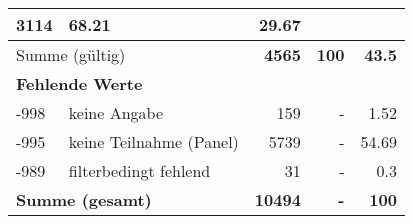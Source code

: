 \begin{longtable}{lXrrr}
       \num{3114} &
       \num[round-mode=places,round-precision=2]{68.21} &
         \num[round-mode=places,round-precision=2]{29.67} \\
     \midrule
     \multicolumn{2}{l}{Summe (gültig)} &
       \textbf{\num{4565}} &
     \textbf{\num{100}} &
       \textbf{\num[round-mode=places,round-precision=2]{43.5}} \\
     \multicolumn{5}{l}{\textbf{Fehlende Werte}}\\
       -998 &
       keine Angabe &
         \num{159} &
        - &
         \num[round-mode=places,round-precision=2]{1.52} \\
       -995 &
       keine Teilnahme (Panel) &
         \num{5739} &
        - &
         \num[round-mode=places,round-precision=2]{54.69} \\
       -989 &
       filterbedingt fehlend &
         \num{31} &
        - &
         \num[round-mode=places,round-precision=2]{0.3} \\
     \midrule
     \multicolumn{2}{l}{\textbf{Summe (gesamt)}} &
          \textbf{\num{10494}} &
        \textbf{-} &
        \textbf{\num{100}} \\
     \bottomrule
     \end{longtable}
     
